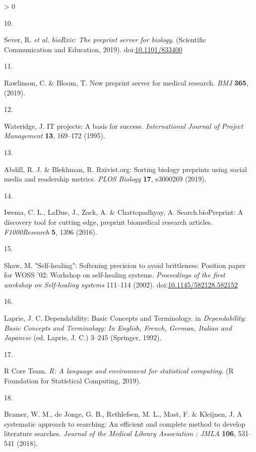 \documentclass[a4paper, twoside]{templates/ociamthesis}
\newlength{\cslhangindent}
\newlength{\csllabelwidth}
\newenvironment{CSLReferences}[3] %
 {%
  \setlength{\parindent}{0pt}
  \ifodd #1 \everypar{\setlength{\hangindent}{\cslhangindent}}\ignorespaces\fi
  \ifnum #2 > 0
  \setlength{\parskip}{#2\baselineskip}
  \fi
 }%
 {}
\newcommand{\CSLLeftMargin}[1]{\parbox[t]{\maxof{\widthof{#1}}{\csllabelwidth}}{#1}}
\newcommand{\CSLRightInline}[1]{\parbox[t]{\linewidth - \csllabelwidth}{#1}}
\begin{document}
\begin{CSLReferences}{0}{0}
\leavevmode\hypertarget{ref-sever2019}{}%
\CSLLeftMargin{10. }
\CSLRightInline{Sever, R. \emph{et al.} \emph{{bioRxiv}: The preprint server for biology}. ({Scientific Communication and Education}, 2019). doi:\href{https://doi.org/10.1101/833400}{10.1101/833400}}

\leavevmode\hypertarget{ref-rawlinson2019}{}%
\CSLLeftMargin{11. }
\CSLRightInline{Rawlinson, C. \& Bloom, T. New preprint server for medical research. \emph{BMJ} \textbf{365}, (2019).}

\leavevmode\hypertarget{ref-wateridge1995}{}%
\CSLLeftMargin{12. }
\CSLRightInline{Wateridge, J. {IT} projects: A basis for success. \emph{International Journal of Project Management} \textbf{13}, 169--172 (1995).}

\leavevmode\hypertarget{ref-abdill2019}{}%
\CSLLeftMargin{13. }
\CSLRightInline{Abdill, R. J. \& Blekhman, R. Rxivist.org: {Sorting} biology preprints using social media and readership metrics. \emph{PLOS Biology} \textbf{17}, e3000269 (2019).}

\leavevmode\hypertarget{ref-iwema2016}{}%
\CSLLeftMargin{14. }
\CSLRightInline{Iwema, C. L., LaDue, J., Zack, A. \& Chattopadhyay, A. Search.{bioPreprint}: A discovery tool for cutting edge, preprint biomedical research articles. \emph{F1000Research} \textbf{5}, 1396 (2016).}

\leavevmode\hypertarget{ref-shaw2002}{}%
\CSLLeftMargin{15. }
\CSLRightInline{Shaw, M. "{Self}-healing": Softening precision to avoid brittleness: Position paper for {WOSS} '02: Workshop on self-healing systems. \emph{Proceedings of the first workshop on Self-healing systems} 111--114 (2002). doi:\href{https://doi.org/10.1145/582128.582152}{10.1145/582128.582152}}

\leavevmode\hypertarget{ref-laprie1992}{}%
\CSLLeftMargin{16. }
\CSLRightInline{Laprie, J. C. Dependability: {Basic Concepts} and {Terminology}. in \emph{Dependability: {Basic Concepts} and {Terminology}: {In English}, {French}, {German}, {Italian} and {Japanese}} (ed. Laprie, J. C.) 3--245 ({Springer}, 1992).}

\leavevmode\hypertarget{ref-rcoreteam2019}{}%
\CSLLeftMargin{17. }
\CSLRightInline{R Core Team. \emph{R: {A} language and environment for statistical computing}. ({R Foundation for Statistical Computing}, 2019).}

\leavevmode\hypertarget{ref-bramer2018}{}%
\CSLLeftMargin{18. }
\CSLRightInline{Bramer, W. M., de Jonge, G. B., Rethlefsen, M. L., Mast, F. \& Kleijnen, J. A systematic approach to searching: An efficient and complete method to develop literature searches. \emph{Journal of the Medical Library Association : JMLA} \textbf{106}, 531--541 (2018).}


\end{CSLReferences}
\end{document}

